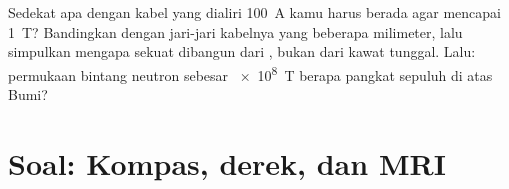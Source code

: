 \begin{exercise}[$\star\star\star$]\label{exo:g11:magnetic-fields:15}
Sedekat apa dengan kabel yang dialiri \qty{100}{A} kamu harus berada
agar  mencapai \qty{1}{T}? Bandingkan dengan jari-jari kabelnya
yang beberapa milimeter, lalu simpulkan mengapa  sekuat 
dibangun dari , bukan dari kawat tunggal. Lalu: 
permukaan bintang neutron sebesar \qty{e8}{T} berapa pangkat sepuluh di
atas  Bumi?
\end{exercise}

\section{Soal: Kompas, derek, dan MRI}

